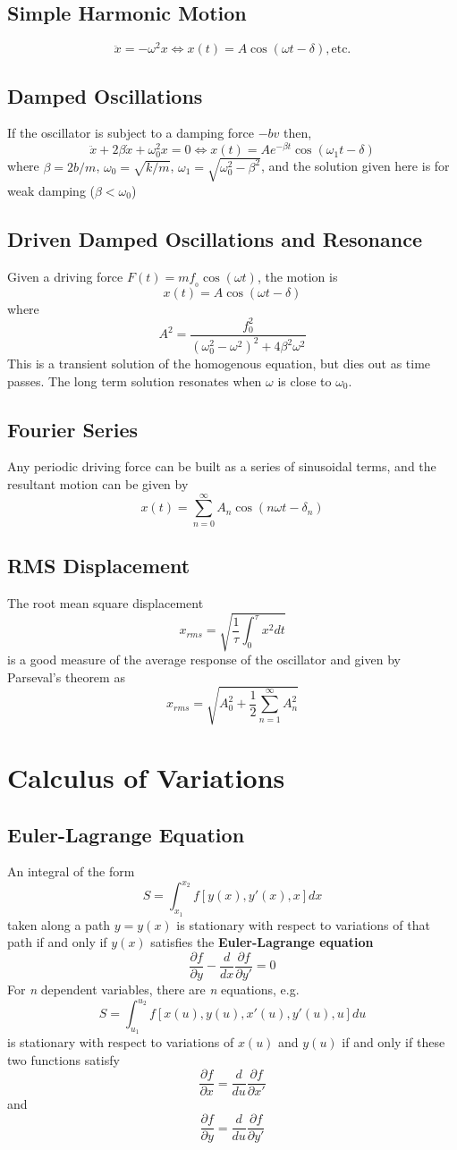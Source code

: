 \documentclass{article}
\begin{document}
\subsection{Simple Harmonic Motion}
$$
\ddot{x} = -\omega^2 x \iff x(t) = A\cos(\omega t - \delta), \text{etc.}
$$
\subsection{Damped Oscillations}
If the oscillator is subject to a damping force $-bv$ then,
$$
\ddot{x} + 2\beta \dot{x} + \omega_0^2 x = 0 \iff x(t) = Ae^{-\beta t} \cos(\omega_1 t-\delta)
$$
where $\beta = 2b/m$, $\omega_0 = \sqrt{k/m}$, $\omega_1 = \sqrt{\omega_0^2 - \beta^2}$, and the solution given here is for weak damping ($\beta < \omega_0$)
\subsection{Driven Damped Oscillations and Resonance}
Given a driving force $F(t) = mf__0\cos(\omega t)$, the motion is 
$$
x(t) = A\cos(\omega t - \delta)
$$
where 
$$
A^2 = \frac{f_0^2}{(\omega_0^2 - \omega^2)^2 + 4\beta^2\omega^2}
$$
This is a transient solution of the homogenous equation, but dies out as time passes.  The long term solution resonates when $\omega$ is close to $\omega_0$.
\subsection{Fourier Series}
Any periodic driving force can be built as a series of sinusoidal terms, and the resultant motion can be given by 
$$
x(t) = \sum_{n=0}^\infty A_n\cos(n\omega t - \delta_n)
$$
\subsection{RMS Displacement}
The root mean square displacement 
$$
x_{rms} = \sqrt{\frac{1}{\tau} \int_0^\tau x^2 dt}
$$
is a good measure of the average response of the oscillator and given by Parseval's theorem as
$$
x_{rms} = \sqrt{A_0^2 + \frac{1}{2}\sum_{n=1}^\infty A_n^2}
$$
\section{Calculus of Variations}
\subsection{Euler-Lagrange Equation}
An integral of the form
$$
S = \int_{x_{1}}^{x_2} f[y(x), y'(x), x]dx
$$
taken along a path $y=y(x)$ is stationary with respect to variations of that path if and only if $y(x)$ satisfies the \textbf{Euler-Lagrange equation}
$$
\frac{\partial f}{\partial y} - \frac{d}{dx}\frac{\partial f}{\partial y'} = 0
$$
For \textit{n} dependent variables, there are \textit{n} equations, e.g.
$$
S = \int_{u_{1}}^{u_2} f[x(u), y(u), x'(u), y'(u), u]du
$$
is stationary with respect to variations of $x(u)$ and $y(u)$ if and only if these two functions satisfy
$$
\frac{\partial f}{\partial x} = \frac{d}{du}\frac{\partial f}{\partial x'}
$$
and
$$
\frac{\partial f}{\partial y} = \frac{d}{du}\frac{\partial f}{\partial y'}
$$
\end{document}
